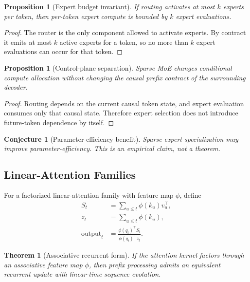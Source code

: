 \documentclass[11pt]{article}
\newtheorem{theorem}[definition]{Theorem}
\newtheorem{proposition}[definition]{Proposition}
\newtheorem{conjecture}[definition]{Conjecture}
\begin{document}
\begin{proposition}[Expert budget invariant]
If routing activates at most $k$ experts per token, then per-token expert
compute is bounded by $k$ expert evaluations.
\end{proposition}

\begin{proof}
The router is the only component allowed to activate experts. By contract it
emits at most $k$ active experts for a token, so no more than $k$ expert
evaluations can occur for that token.
\end{proof}

\begin{proposition}[Control-plane separation]
Sparse MoE changes conditional compute allocation without changing the causal
prefix contract of the surrounding decoder.
\end{proposition}

\begin{proof}
Routing depends on the current causal token state, and expert evaluation
consumes only that causal state. Therefore expert selection does not introduce
future-token dependence by itself.
\end{proof}

\begin{conjecture}[Parameter-efficiency benefit]
Sparse expert specialization may improve parameter-efficiency. This is an
empirical claim, not a theorem.
\end{conjecture}

\subsection{Linear-Attention Families}

For a factorized linear-attention family with feature map $\phi$, define
\begin{align}
  S_t &= \sum_{u \le t} \phi(k_u) v_u^\top, \\
  z_t &= \sum_{u \le t} \phi(k_u), \\
  \mathrm{output}_t &= \frac{\phi(q_t)^\top S_t}{\phi(q_t)^\top z_t}.
\end{align}

\begin{theorem}[Associative recurrent form]
If the attention kernel factors through an associative feature map $\phi$, then
prefix processing admits an equivalent recurrent update with linear-time
sequence evolution.
\end{theorem}
\end{document}
